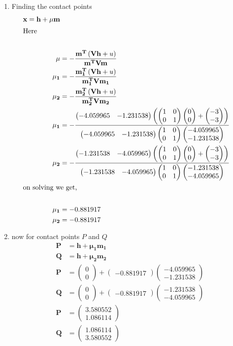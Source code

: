 \documentclass[11pt, a4paper]{article}
\newcommand{\myvec}[1]{\ensuremath{\begin{pmatrix}#1\end{pmatrix}}}
\let\vec\mathbf
\providecommand{\brak}[1]{\ensuremath{\left(#1\right)}}
\begin{document}
\begin{enumerate}
\begin{enumerate}
\item Finding  the contact points 
	\begin{align}
		\vec{x}=\vec{h}+\vec{\mu}\vec{m} \\
\intertext{Here  }   \nonumber \\
		\vec{\mu} &=-\frac{\vec{m^T}\brak{\vec{V}\vec{h}+u}}{\vec{m^T}\vec{V}\vec{m}}  \\
		\vec{\mu_1} &=-\frac{\vec{m_1^T}\brak{\vec{V}\vec{h}+u}}{\vec{m_1^T}\vec{V}\vec{m_1}} \\
		\vec{\mu_2} &=-\frac{\vec{m_2^T}\brak{\vec{V}\vec{h}+u}}{\vec{m_2^T}\vec{V}\vec{m_2}} \\
		\vec{\mu_1} &=-\frac{ \myvec{ -4.059965 & -1.231538}\brak{\myvec{1 &0 \\0 &1}\myvec{0 \\0}+\myvec{-3 \\-3}}}{\myvec{-4.059965 & -1.231538} \myvec{1 &0 \\ 0 & 1}\myvec{-4.059965 \\ -1.231538}} \\
		\vec{\mu_2} &=-\frac{ \myvec{ -1.231538 & -4.059965}\brak{\myvec{1 &0 \\0 &1}\myvec{0 \\0}+\myvec{-3 \\-3}}}{\myvec{-1.231538 & -4.059965} \myvec{1 &0 \\ 0 & 1}\myvec{-1.231538 \\ -4.059965}} \\
\intertext{on solving we get, }   \nonumber \\
		\vec{\mu_1} &=-0.881917 \\
		\vec{\mu_2} &=-0.881917
	\end{align}

\item now for contact points $P$ and $Q$
	\begin{align}
		\vec{P} &=\vec{h}+\vec{\mu_1}\vec{m_1} \\
		\vec{Q} &=\vec{h}+\vec{\mu_2}\vec{m_2} \\
		\vec{P} &=\myvec{0 \\0}+\myvec{-0.881917}\myvec{-4.059965 \\ -1.231538} \\
		\vec{Q} &=\myvec{0 \\0}+\myvec{-0.881917}\myvec{-1.231538 \\ -4.059965} \\
		\vec{P} &=\myvec{ 3.580552\\ 1.086114} \\
		\vec{Q} &=\myvec{ 1.086114\\ 3.580552} 
	\end{align}


\end{enumerate}
\end{enumerate}
\end{document}
